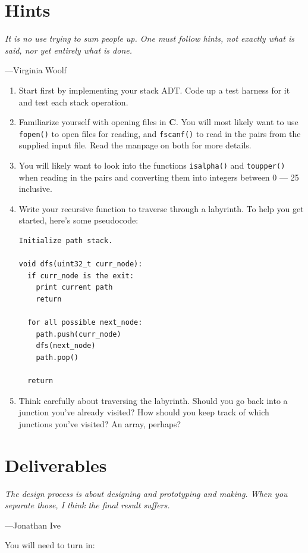\documentclass[11pt]{article}
\begin{document}
\section{Hints}
\textwidth
\epigraph{\emph{It is no use trying to sum people up. One must follow hints,
not exactly what is said, nor yet entirely what is done.}}{---Virginia Woolf}

\begin{enumerate}
    \item Start first by implementing your stack ADT. Code up a test harness for
        it and test each stack operation.
    \item Familiarize yourself with opening files in \textbf{C}. You will most
        likely want to use \texttt{fopen()} to open files for reading, and
        \texttt{fscanf()} to read in the pairs from the supplied input file.
        Read the manpage on both for more details.
    \item You will likely want to look into the functions \texttt{isalpha()} and
        \texttt{toupper()} when reading in the pairs and converting them into
        integers between 0 --- 25 inclusive.
    \item Write your recursive function to traverse through a labyrinth. To help
        you get started, here's some pseudocode:
\begin{lstlisting}
Initialize path stack.

void dfs(uint32_t curr_node):
  if curr_node is the exit:
    print current path
    return

  for all possible next_node:
    path.push(curr_node)
    dfs(next_node)
    path.pop()

  return
\end{lstlisting}
    \item Think carefully about traversing the labyrinth. Should you go back
        into a junction you've already visited? How should you keep track of
        which junctions you've visited? An array, perhaps?
\end{enumerate}

\section{Deliverables}
\textwidth
\epigraph{\emph{The design process is about designing and prototyping and
making. When you separate those, I think the final result
suffers.}}{---Jonathan Ive}

You will need to turn in:
\end{document}
